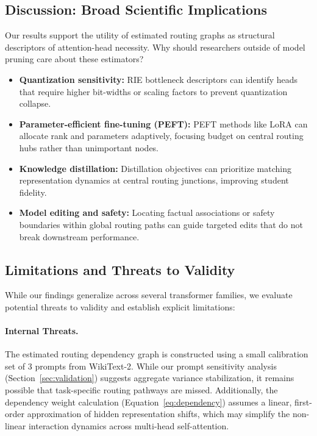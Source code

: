 \documentclass[11pt,a4paper]{article}
\theoremstyle{definition}
\theoremstyle{plain}
\begin{document}
\subsection{Discussion: Broad Scientific Implications}
Our results support the utility of estimated routing graphs as structural descriptors of attention-head necessity. Why should researchers outside of model pruning care about these estimators?
\begin{itemize}
    \item \textbf{Quantization sensitivity:} RIE bottleneck descriptors can identify heads that require higher bit-widths or scaling factors to prevent quantization collapse.
    \item \textbf{Parameter-efficient fine-tuning (PEFT):} PEFT methods like LoRA can allocate rank and parameters adaptively, focusing budget on central routing hubs rather than unimportant nodes.
    \item \textbf{Knowledge distillation:} Distillation objectives can prioritize matching representation dynamics at central routing junctions, improving student fidelity.
    \item \textbf{Model editing and safety:} Locating factual associations or safety boundaries within global routing paths can guide targeted edits that do not break downstream performance.
\end{itemize}



\subsection{Limitations and Threats to Validity}
\label{sec:limitations}
While our findings generalize across several transformer families, we evaluate potential threats to validity and establish explicit limitations:

\paragraph{Internal Threats.} The estimated routing dependency graph is constructed using a small calibration set of 3 prompts from WikiText-2. While our prompt sensitivity analysis (Section~\ref{sec:validation}) suggests aggregate variance stabilization, it remains possible that task-specific routing pathways are missed. Additionally, the dependency weight calculation (Equation~\ref{eq:dependency}) assumes a linear, first-order approximation of hidden representation shifts, which may simplify the non-linear interaction dynamics across multi-head self-attention.
\end{document}
